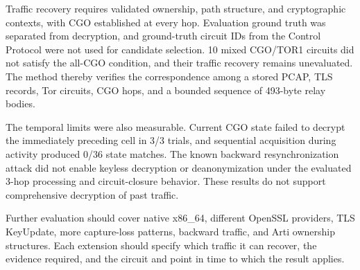 \documentclass[10pt,a4paper]{article}
\newcommand{\torone}{\textsc{TOR1}}
\begin{document}
Traffic recovery requires validated ownership, path structure, and cryptographic contexts, with CGO established at every hop. Evaluation ground truth was separated from decryption, and ground-truth circuit IDs from the Control Protocol were not used for candidate selection. 10 mixed CGO/\torone{} circuits did not satisfy the all-CGO condition, and their traffic recovery remains unevaluated.
The method thereby verifies the correspondence among a stored PCAP, TLS records, Tor circuits, CGO hops, and a bounded sequence of 493-byte relay bodies.

The temporal limits were also measurable. Current CGO state failed to decrypt the immediately preceding cell in 3/3 trials, and sequential acquisition during activity produced 0/36 state matches. The known backward resynchronization attack did not enable keyless decryption or deanonymization under the evaluated 3-hop processing and circuit-closure behavior. These results do not support comprehensive decryption of past traffic.

Further evaluation should cover native x86\_64, different OpenSSL providers, TLS KeyUpdate, more capture-loss patterns, backward traffic, and Arti ownership structures. Each extension should specify which traffic it can recover, the evidence required, and the circuit and point in time to which the result applies.

\printbibliography[title={References}]
\end{document}
